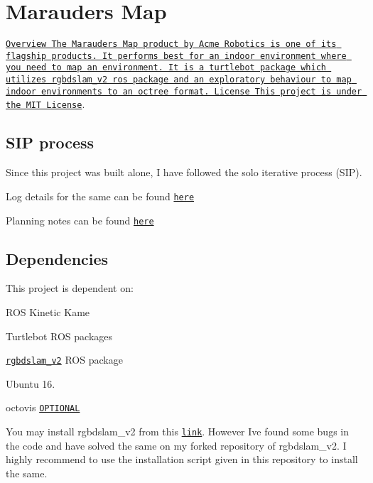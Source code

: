 \section*{Marauders Map }

\href{https://travis-ci.org/karanvivekbhargava/marauders_map}{\tt } \href{https://coveralls.io/github/karanvivekbhargava/marauders_map?branch=master}{\tt } \href{https://opensource.org/licenses/MIT}{\tt Overview The Marauders Map product by Acme Robotics is one of its flagship products. It performs best for an indoor environment where you need to map an environment. It is a turtlebot package which utilizes rgbdslam\+\_\+v2 ros package and an exploratory behaviour to map indoor environments to an octree format. License This project is under the M\+IT License}.

\subsection*{S\+IP process}

Since this project was built alone, I have followed the solo iterative process (S\+IP).

Log details for the same can be found \href{https://docs.google.com/spreadsheets/d/1UN-LUKyeZunZTpRnJA9aYaXh8SntVCdyPhzmPg2l0AY/edit#gid=0}{\tt here}

Planning notes can be found \href{https://docs.google.com/document/d/1BU2oDnlLBrMnNgZKm1wX3ZKhkwUWr54Su3-iXXmer3M/edit?usp=sharing}{\tt here}

\subsection*{Dependencies}

This project is dependent on\+:
\begin{DoxyItemize}
\item R\+OS Kinetic Kame
\item Turtlebot R\+OS packages
\item \href{https://github.com/felixendres/rgbdslam_v2}{\tt rgbdslam\+\_\+v2} R\+OS package
\item Ubuntu 16.
\item octovis \href{used to view .ot files}{\tt O\+P\+T\+I\+O\+N\+AL}
\end{DoxyItemize}

You may install rgbdslam\+\_\+v2 from this \href{https://github.com/felixendres/rgbdslam_v2}{\tt link}. However I\textquotesingle{}ve found some bugs in the code and have solved the same on my forked repository of rgbdslam\+\_\+v2. I highly recommend to use the installation script given in this repository to install the same.

